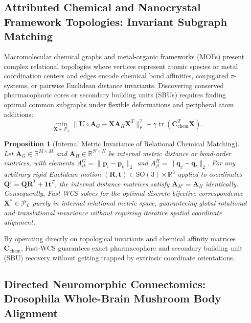 \documentclass[conference]{IEEEtran}
\newtheorem{proposition}{Proposition}
\begin{document}
\subsection{Attributed Chemical and Nanocrystal Framework Topologies: Invariant Subgraph Matching}
\label{subsec:domain_molecular}

Macromolecular chemical graphs and metal-organic frameworks (MOFs) present complex relational topologies where vertices represent atomic species or metal coordination centers and edges encode chemical bond affinities, conjugated $\pi$-systems, or pairwise Euclidean distance invariants. Discovering conserved pharmacophoric cores or secondary building units (SBUs) requires finding optimal common subgraphs under flexible deformations and peripheral atom additions:
\begin{equation}
\min_{\mathbf{X} \in \mathcal{P}_L} \|\mathbf{U} \circ \mathbf{A}_G - \mathbf{X}\mathbf{A}_H\mathbf{X}^T\|_F^2 + \gamma \operatorname{tr}(\mathbf{C}_{\text{chem}}^T \mathbf{X}).
\label{eq:chemical_opt}
\end{equation}

\begin{proposition}[Internal Metric Invariance of Relational Chemical Matching]
\label{prop:chemical_invariance}
Let $\mathbf{A}_G \in \mathbb{R}^{M \times M}$ and $\mathbf{A}_H \in \mathbb{R}^{N \times N}$ be internal metric distance or bond-order matrices, with elements $A_{ik}^G = \|\mathbf{p}_i - \mathbf{p}_k\|_2$ and $A_{jl}^H = \|\mathbf{q}_j - \mathbf{q}_l\|_2$. For any arbitrary rigid Euclidean motion $(\mathbf{R}, \mathbf{t}) \in \mathrm{SO}(3) \times \mathbb{R}^3$ applied to coordinates $\mathbf{Q}' = \mathbf{Q}\mathbf{R}^T + \mathbf{1}\mathbf{t}^T$, the internal distance matrices satisfy $\mathbf{A}_{H'} = \mathbf{A}_H$ identically. Consequently, Fast-WCS solves for the optimal discrete bijective correspondence $\mathbf{X}^* \in \mathcal{P}_L$ purely in internal relational metric space, guaranteeing global rotational and translational invariance without requiring iterative spatial coordinate alignment.
\end{proposition}
By operating directly on topological invariants and chemical affinity matrices $\mathbf{C}_{\text{chem}}$, Fast-WCS guarantees exact pharmacophore and secondary building unit (SBU) recovery without getting trapped by extrinsic coordinate orientations.

\subsection{Directed Neuromorphic Connectomics: Drosophila Whole-Brain Mushroom Body Alignment}
\label{subsec:domain_connectome}
\end{document}
